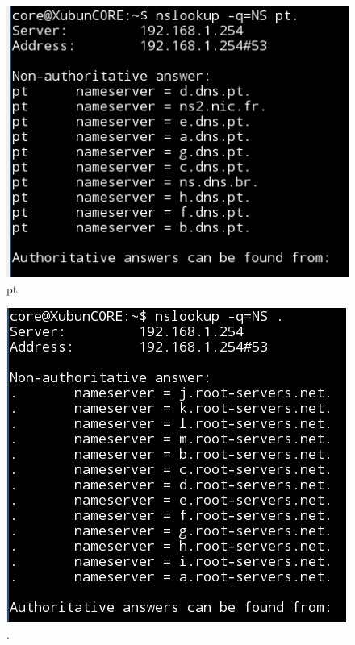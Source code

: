 \documentclass[a4paper]{report}
\begin{document}
\begin{figure}[H]
    \centering 
    \includegraphics[width=\textwidth]{images/ptponto.png}  
    \caption{pt.}
    \label{fig:ptponto}
\end{figure}

\begin{figure}[H]
    \centering 
    \includegraphics[width=\textwidth]{images/ponto.png}  
    \caption{.}
    \label{fig:ponto}
\end{figure}
\end{document}
